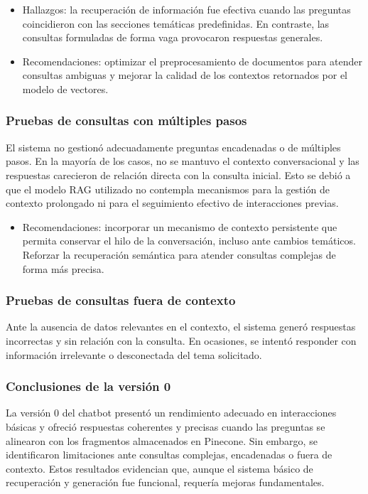 \begin{itemize}
    \item Hallazgos: la recuperación de información fue efectiva cuando las preguntas coincidieron con las secciones temáticas predefinidas. En contraste, las consultas formuladas de forma vaga provocaron respuestas generales.
    \item Recomendaciones: optimizar el preprocesamiento de documentos para atender consultas ambiguas y mejorar la calidad de los contextos retornados por el modelo de vectores.
\end{itemize}

\subsubsection{Pruebas de consultas con múltiples pasos}

El sistema no gestionó adecuadamente preguntas encadenadas o de múltiples pasos. En la mayoría de los casos, no se mantuvo el contexto conversacional y las respuestas carecieron de relación directa con la consulta inicial. Esto se debió a que el modelo RAG utilizado no contempla mecanismos para la gestión de contexto prolongado ni para el seguimiento efectivo de interacciones previas.

\begin{itemize}
    \item Recomendaciones: incorporar un mecanismo de contexto persistente que permita conservar el hilo de la conversación, incluso ante cambios temáticos. Reforzar la recuperación semántica para atender consultas complejas de forma más precisa.
\end{itemize}

\subsubsection{Pruebas de consultas fuera de contexto}

Ante la ausencia de datos relevantes en el contexto, el sistema generó respuestas incorrectas y sin relación con la consulta. En ocasiones, se intentó responder con información irrelevante o desconectada del tema solicitado.

\subsubsection{Conclusiones de la versión 0}

La versión 0 del chatbot presentó un rendimiento adecuado en interacciones básicas y ofreció respuestas coherentes y precisas cuando las preguntas se alinearon con los fragmentos almacenados en Pinecone. Sin embargo, se identificaron limitaciones ante consultas complejas, encadenadas o fuera de contexto. Estos resultados evidencian que, aunque el sistema básico de recuperación y generación fue funcional, requería mejoras fundamentales.


